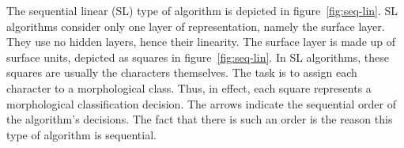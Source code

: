 The sequential linear (SL) type of algorithm is depicted in figure~\ref{fig:seq-lin}. 
SL algorithms consider only one layer of representation, namely the surface layer. 
They use no hidden layers, hence their linearity. The surface layer is made up of surface units, depicted as squares in figure~\ref{fig:seq-lin}.
In SL algorithms, these squares are usually the characters themselves. 
The task is to assign each character to a morphological class. Thus, in effect, 
each square represents a morphological classification decision.
The arrows indicate the sequential order of the algorithm's decisions. 
The fact that there is such an order is the reason this type of algorithm is sequential.

